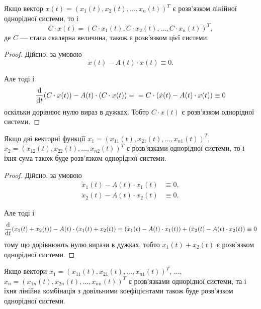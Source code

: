 \setcounter{property}{0}
\begin{property}
	Якщо вектор $x(t) = (x_1(t), x_2(t), \ldots, x_n(t))^T$ є розв'язком лінійної однорідної системи, то і \[ C \cdot x(t) = (C \cdot x_1(t), C \cdot x_2(t), \ldots, C \cdot x_n(t))^T,\] де $C$ --- стала скалярна величина, також є розв'язком цієї системи.
\end{property}

\begin{proof}
	Дійсно, за умовою 
	\begin{equation*}
		\dot x(t) - A(t) \cdot x(t) \equiv 0.
	\end{equation*}

	Але тоді і
	\begin{equation*}
		\frac{\mathop{}\!\mathrm{d}}{\mathop{}\!\mathrm{d} t} (C \cdot x(t)) - A(t) \cdot (C \cdot x(t)) = \\ = C \cdot (\dot x(t) - A(t) \cdot x(t)) \equiv 0
	\end{equation*}
	оскільки дорівнює нулю вираз в дужках. Тобто $C \cdot x(t)$ є розв'язком однорідної системи.
\end{proof}

\begin{property}
	Якщо дві векторні функції $x_1 = (x_{11}(t), x_{21}(t), \ldots, x_{n1}(t))^T$, $x_2 = (x_{12}(t), x_{22}(t), \ldots, x_{n2}(t))^T$ є розв'язками однорідної системи, то і їхня сума також буде розв'язком однорідної системи.
\end{property}

\begin{proof}
	Дійсно, за умовою
	\begin{align*}
		\dot x_1(t) - A(t) \cdot x_1(t) &\equiv 0, \\
		\dot x_2(t) - A(t) \cdot x_2(t) &\equiv 0.
	\end{align*}

	Але тоді і
	\begin{equation*}
		\frac{\mathop{}\!\mathrm{d}}{\mathop{}\!\mathrm{d} t} (x_1(t) + x_2(t)) - A(t) \cdot (x_1(t) + x_2(t)) = (\dot x_1(t) - A(t) \cdot x_1(t)) + (\dot x_2(t) - A(t) \cdot x_2(t)) \equiv 0
	\end{equation*}
	тому що дорівнюють нулю вирази в дужках, тобто $x_1(t) + x_2(t)$ є розв'язком однорідної системи.
\end{proof}

\begin{property}
	Якщо вектори $x_1 = (x_{11}(t), x_{21}(t), \ldots, x_{n1}(t))^T$, $\ldots$, $x_n = (x_{1n}(t), x_{2n}(t), \ldots, x_{nn}(t))^T$ є розв'язками однорідної системи, та і їхня лінійна комбінація з довільними коефіцієнтами також буде розв'язком однорідної системи. 
\end{property}

